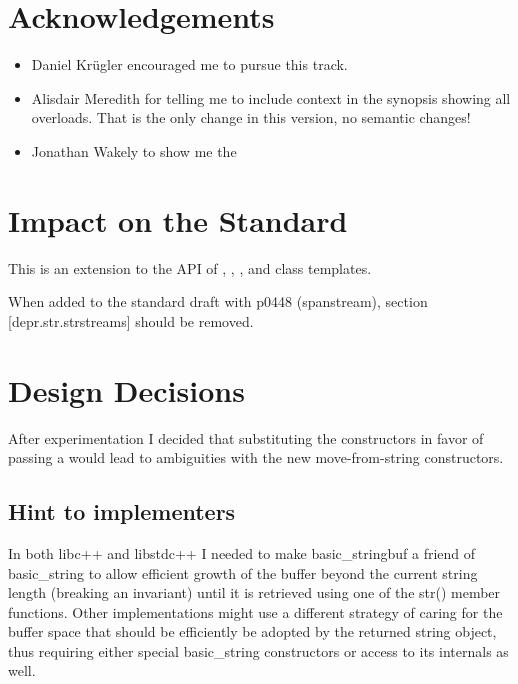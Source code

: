\documentclass[ebook,11pt,article]{memoir}
\begin{document}
\chapter{Acknowledgements}
\begin{itemize}
\item Daniel Kr\"ugler encouraged me to pursue this track.
\item Alisdair Meredith for telling me to include context in the synopsis showing all overloads. That is the only change in this version, no semantic changes!
\item Jonathan Wakely to show me the 
\end{itemize}




\chapter{Impact on the Standard}
This is an extension to the API of , , , and  class templates.

When added to the standard draft with p0448 (spanstream), section [depr.str.strstreams] should be removed.


\chapter{Design Decisions}
After experimentation I decided that substituting the  constructors in favor of passing a  would lead to ambiguities with the new move-from-string constructors.

\section{Hint to implementers}
In both libc++ and libstdc++ I needed to make basic_stringbuf a friend of basic_string to allow efficient growth of the buffer beyond the current string length (breaking an invariant) until it is retrieved using one of the str() member functions. Other implementations might use a different strategy of caring for the buffer space that should be efficiently be adopted by the returned string object, thus requiring either special basic_string constructors or access to its internals as well.
\end{document}
